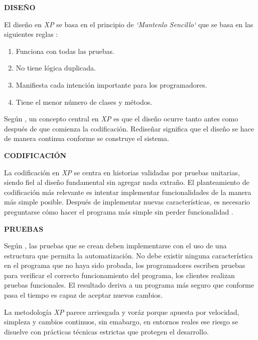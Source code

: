 \textbf{DISEÑO}

El diseño en \textit{XP} se basa en el principio de \textit{`Mantenlo Sencillo`} que se basa en las siguientes reglas \parencite{solis2003XP}:

\begin{enumerate}
    \item Funciona con todas las pruebas.
    \item No tiene lógica duplicada.
    \item Manifiesta cada intención importante para los programadores.
    \item Tiene el menor número de clases y métodos.
\end{enumerate}

Según \parencite{pressman2010ingenieria}, un concepto central en \textit{XP} es que el diseño ocurre tanto antes como después de que comienza la codificación. Rediseñar significa que el diseño se hace de manera continua conforme se construye el sistema.

\textbf{CODIFICACIÓN}

La codificación en \textit{XP} se centra en historias validadas por pruebas unitarias, siendo fiel al diseño fundamental sin agregar nada extraño. El planteamiento de codificación más relevante es intentar implementar funcionalidades de la manera más simple posible. Después de implementar nuevas características, es necesario preguntarse cómo hacer el programa más simple sin perder funcionalidad \parencite{solis2003XP}.

\newpage

\textbf{PRUEBAS}

Según \parencite{pressman2010ingenieria}, las pruebas que se crean deben implementarse con el uso de una estructura que permita la automatización. 
No debe existir ninguna característica en el programa que no haya sido probada, los programadores escriben pruebas para verificar el correcto funcionamiento del programa, los clientes realizan pruebas funcionales. El resultado deriva a un programa más seguro que conforme pasa el tiempo es capaz de aceptar nuevos cambios.

La metodología \textit{XP} parece arriesgada y voráz porque apuesta por velocidad, simpleza y cambios continuos, sin emabargo, en entornos reales ese riesgo se disuelve con prácticas técnicas estrictas que protegen el desarrollo.

